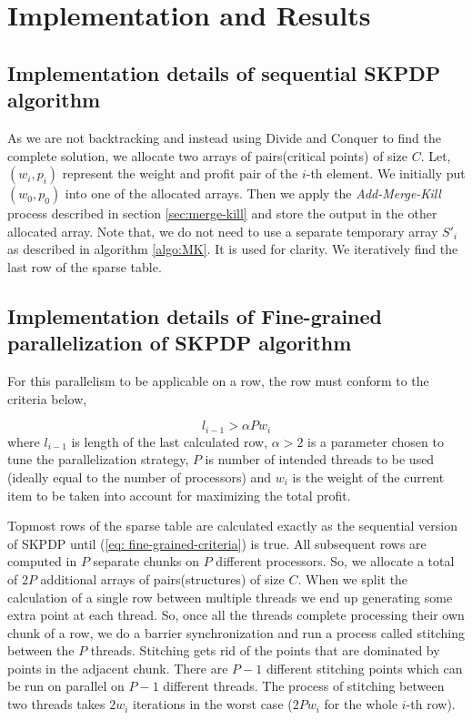 \chapter{Implementation and Results}
\label{chap:implementation-results}




\section{Implementation details of sequential SKPDP algorithm}
As we are not backtracking and instead using Divide and Conquer to find the complete solution, we allocate two arrays of pairs(critical points) of size $C$. Let, $(w_i,p_i)$ represent the weight and profit pair of the $i$-th element. We initially put $(w_0,p_0)$ into one of the allocated arrays. Then we apply the \textit{Add-Merge-Kill} process described in section \ref{sec:merge-kill} and store the output in the other allocated array. Note that, we do not need to use a separate temporary array $S'_i$ as described in algorithm \ref{algo:MK}. It is used for clarity. We iteratively find the last row of the sparse table.


\section{Implementation details of Fine-grained parallelization of SKPDP algorithm}
For this parallelism to be applicable on a row, the row must conform to the criteria below,

\begin{equation}
\label{eq: fine-grained-criteria}
l_{i-1} > \alpha P w_i
\end{equation}
where $l_{i-1}$ is length of the last calculated row, $\alpha>2$ is a parameter chosen to tune the parallelization strategy, $P$ is number of intended threads to be used (ideally equal to the number of processors) and $w_i$ is the weight of the current item to be taken into account for maximizing the total profit.

Topmost rows of the sparse table are calculated exactly as the sequential version of SKPDP until (\ref{eq: fine-grained-criteria}) is true. All subsequent rows are computed in $P$ separate chunks on $P$ different processors. So, we allocate a total of $2P$ additional arrays of pairs(structures) of size $C$. When we split the calculation of a single row between multiple threads we end up generating some extra point at each thread. So, once all the threads complete processing their own chunk of a row, we do a barrier synchronization and run a process called stitching between the $P$ threads. Stitching gets rid of the points that are dominated by points in the adjacent chunk. There are $P-1$ different stitching points which can be run on parallel on $P-1$ different threads. The process of stitching between two threads takes $2w_i$ iterations in the worst case ($2P w_i$ for the whole $i$-th row).



